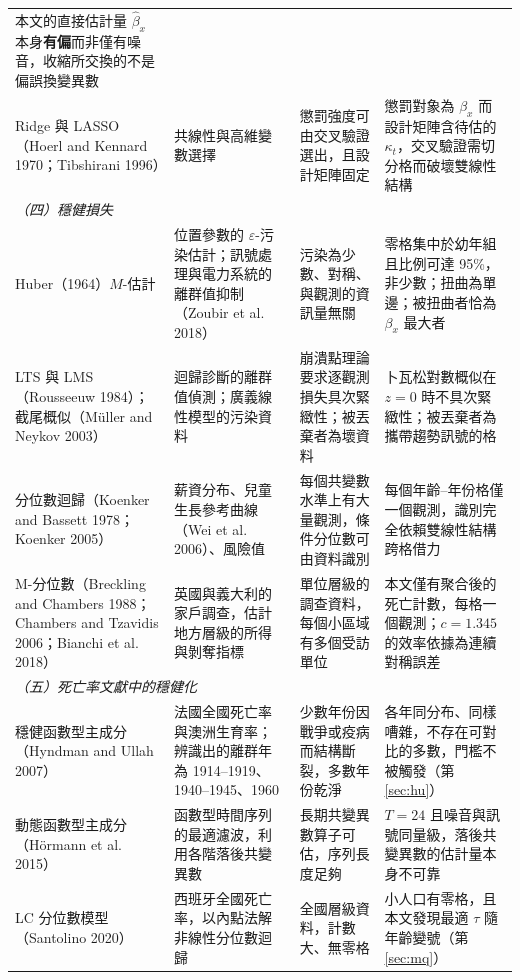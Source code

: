 \documentclass[UTF8, fontset=macnew, a4paper, 12pt]{ctexart}
\begin{document}
\begin{table}[H]
\begin{tabular}{p{2.5cm}p{3.6cm}p{3.7cm}p{4.3cm}}
本文的直接估計量 $\hat\beta_x$ 本身\textbf{有偏}而非僅有噪音，收縮所交換的不是偏誤換變異數\\
Ridge 與 LASSO（Hoerl and Kennard 1970；Tibshirani 1996） &
共線性與高維變數選擇 &
懲罰強度可由交叉驗證選出，且設計矩陣固定 &
懲罰對象為 $\beta_x$ 而設計矩陣含待估的 $\kappa_t$，交叉驗證需切分格而破壞雙線性結構\\
\midrule
\multicolumn{4}{l}{\textit{（四）穩健損失}}\\
Huber（1964）$M$-估計 &
位置參數的 $\varepsilon$-污染估計；訊號處理與電力系統的離群值抑制（Zoubir et al. 2018） &
污染為少數、對稱、與觀測的資訊量無關 &
零格集中於幼年組且比例可達 95\%，非少數；扭曲為單邊；被扭曲者恰為 $\beta_x$ 最大者\\
LTS 與 LMS（Rousseeuw 1984）；截尾概似（Müller and Neykov 2003） &
迴歸診斷的離群值偵測；廣義線性模型的污染資料 &
崩潰點理論要求逐觀測損失具次緊緻性；被丟棄者為壞資料 &
卜瓦松對數概似在 $z=0$ 時不具次緊緻性；被丟棄者為攜帶趨勢訊號的格\\
分位數迴歸（Koenker and Bassett 1978；Koenker 2005） &
薪資分布、兒童生長參考曲線（Wei et al. 2006）、風險值 &
每個共變數水準上有大量觀測，條件分位數可由資料識別 &
每個年齡--年份格僅一個觀測，識別完全依賴雙線性結構跨格借力\\
M-分位數（Breckling and Chambers 1988；Chambers and Tzavidis 2006；Bianchi et al. 2018） &
英國與義大利的家戶調查，估計地方層級的所得與剝奪指標 &
單位層級的調查資料，每個小區域有多個受訪單位 &
本文僅有聚合後的死亡計數，每格一個觀測；$c=1.345$ 的效率依據為連續對稱誤差\\
\midrule
\multicolumn{4}{l}{\textit{（五）死亡率文獻中的穩健化}}\\
穩健函數型主成分（Hyndman and Ullah 2007） &
法國全國死亡率與澳洲生育率；辨識出的離群年為 1914--1919、1940--1945、1960 &
少數年份因戰爭或疫病而結構斷裂，多數年份乾淨 &
各年同分布、同樣嘈雜，不存在可對比的多數，門檻不被觸發（第\ref{sec:hu}）\\
動態函數型主成分（Hörmann et al. 2015） &
函數型時間序列的最適濾波，利用各階落後共變異數 &
長期共變異數算子可估，序列長度足夠 &
$T=24$ 且噪音與訊號同量級，落後共變異數的估計量本身不可靠\\
LC 分位數模型（Santolino 2020） &
西班牙全國死亡率，以內點法解非線性分位數迴歸 &
全國層級資料，計數大、無零格 &
小人口有零格，且本文發現最適 $\tau$ 隨年齡變號（第\ref{sec:mq}）\\
\bottomrule
\end{tabular}
\label{tab:gap}
\end{table}
\end{document}
